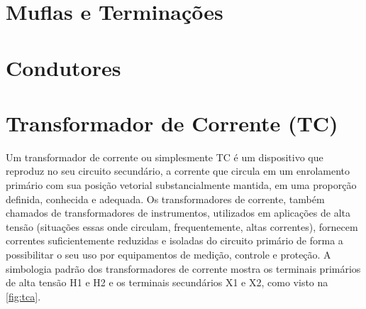 \documentclass[a5paper,english,spanish,brazil]{ufsc-thesis}
\begin{document}
	\section{Muflas e Terminações}

	\section{Condutores}

	\section{Transformador de Corrente (TC)}
		Um transformador de corrente ou simplesmente TC é um dispositivo que reproduz no seu circuito secundário, a corrente que circula em um enrolamento primário com sua posição vetorial substancialmente mantida, em uma proporção definida, conhecida e adequada. Os transformadores de corrente, também chamados de transformadores de instrumentos, utilizados em aplicações de alta tensão (situações essas onde circulam, frequentemente, altas correntes), fornecem correntes suficientemente reduzidas e isoladas do circuito primário de forma a possibilitar o seu uso por equipamentos de medição, controle e proteção. A simbologia padrão dos transformadores de corrente mostra os terminais primários de alta tensão H1 e H2 e os terminais secundários X1 e X2, como visto na \autoref{fig:tca}.
\end{document}
